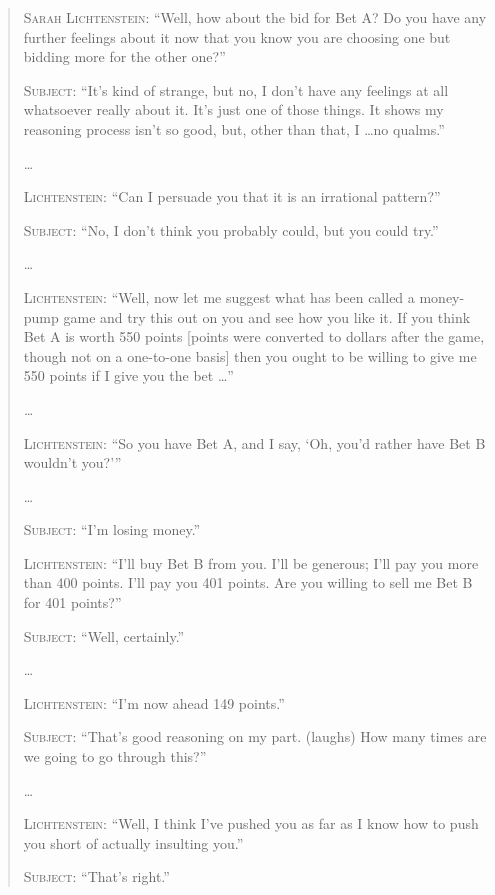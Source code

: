 \begin{quotation}
{
 \textsc{Sarah Lichtenstein}: ``Well, how about the bid for
Bet A? Do you have any further feelings about it now that you know you
are choosing one but bidding more for the other
one?''}

{
 \textsc{Subject}: ``It's kind of strange,
but no, I don't have any feelings at all whatsoever
really about it. It's just one of those things. It
shows my reasoning process isn't so good, but, other
than that, I \ldots no qualms.''}

{
 \ldots}

{
 \textsc{Lichtenstein}: ``Can I persuade you that it is an
irrational pattern?''}

{
 \textsc{Subject}: ``No, I don't think you
probably could, but you could try.''}

{
 \ldots}

{
 \textsc{Lichtenstein}: ``Well, now let me suggest what has
been called a money-pump game and try this out on you and see how you
like it. If you think Bet A is worth 550 points [points were converted
to dollars after the game, though not on a one-to-one basis] then you
ought to be willing to give me 550 points if I give you the bet
\ldots''}

{
 \textit{\ldots}}

{
 \textsc{Lichtenstein}: ``So you have Bet A, and I say,
`Oh, you'd rather have Bet B
wouldn't you?'''}

{
 \ldots}

{
 \textsc{Subject}: ``I'm losing
money.''}

{
 \textsc{Lichtenstein}: ``I'll buy Bet B
from you. I'll be generous; I'll pay
you more than 400 points. I'll pay you 401 points. Are
you willing to sell me Bet B for 401 points?''}

{
 \textsc{Subject}: ``Well, certainly.''}

{
 \ldots}

{
 \textsc{Lichtenstein}: ``I'm now ahead 149
points.''}

{
 \textsc{Subject}: ``That's good reasoning
on my part. (laughs) How many times are we going to go through
this?''}

{
 \ldots}

{
 \textsc{Lichtenstein}: ``Well, I think
I've pushed you as far as I know how to push you short
of actually insulting you.''}

{
 \textsc{Subject}: ``That's
 right.''}
\end{quotation}

